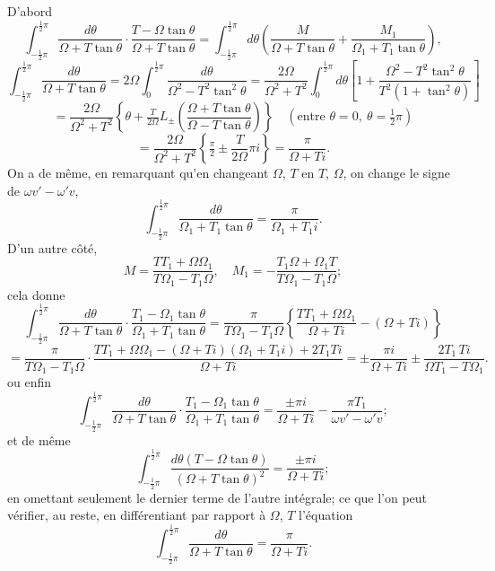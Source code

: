 \documentclass[12pt,a4paper]{article}
\begin{document}
D'abord
\[
\int_{-\frac12\pi}^{\frac12\pi}\frac{d\theta}{\Omega + T\tan\theta}\cdot\frac{T - \Omega\tan\theta}{\Omega + T\tan\theta} = \int_{-\frac12\pi}^{\frac12\pi}d\theta\!\left(\frac{M}{\Omega + T\tan\theta} + \frac{M_1}{\Omega_1 + T_1\tan\theta}\right),
\]
\[
\int_{-\frac12\pi}^{\frac12\pi}\frac{d\theta}{\Omega + T\tan\theta} = 2\Omega\int_0^{\frac12\pi}\frac{d\theta}{\Omega^2 - T^2\tan^2\theta} = \frac{2\Omega}{\Omega^2 + T^2}\int_0^{\frac12\pi}d\theta\!\left[1 + \frac{\Omega^2 - T^2\tan^2\theta}{T^2(1 + \tan^2\theta)}\right]
\]
\[
= \frac{2\Omega}{\Omega^2 + T^2}\!\left\{\theta + \tfrac{T}{2\Omega}L_{\pm}\!\left(\frac{\Omega + T\tan\theta}{\Omega - T\tan\theta}\right)\right\}\quad(\text{entre }\theta = 0,\ \theta = \tfrac12\pi)
\]
\[
= \frac{2\Omega}{\Omega^2 + T^2}\!\left\{\tfrac{\pi}{2} \pm \frac{T}{2\Omega}\pi i\right\} = \frac{\pi}{\Omega + Ti}.
\]
On a de m\^eme, en remarquant qu'en changeant $\Omega$, $T$ en $T$, $\Omega$, on change le signe de $\omega v' - \omega' v$,
\[
\int_{-\frac12\pi}^{\frac12\pi}\frac{d\theta}{\Omega_1 + T_1\tan\theta} = \frac{\pi}{\Omega_1 + T_1 i}.
\]
D'un autre c\^ot\'e,
\[
M = \frac{TT_1 + \Omega\Omega_1}{T\Omega_1 - T_1\Omega},\quad M_1 = -\frac{T_1\Omega + \Omega_1 T}{T\Omega_1 - T_1\Omega};
\]
cela donne
\[
\int_{-\frac12\pi}^{\frac12\pi}\frac{d\theta}{\Omega + T\tan\theta}\cdot\frac{T_1 - \Omega_1\tan\theta}{\Omega_1 + T_1\tan\theta} = \frac{\pi}{T\Omega_1 - T_1\Omega}\!\left\{\frac{TT_1 + \Omega\Omega_1}{\Omega + Ti} - (\Omega + T i)\right\}
\]
\[
= \frac{\pi}{T\Omega_1 - T_1\Omega}\cdot\frac{TT_1 + \Omega\Omega_1 - (\Omega + Ti)(\Omega_1 + T_1 i) + 2T_1 Ti}{\Omega + Ti} = \pm\frac{\pi i}{\Omega + Ti} \pm \frac{2T_1\,Ti}{\Omega T_1 - T\Omega_1}.
\]
ou enfin
\[
\int_{-\frac12\pi}^{\frac12\pi}\frac{d\theta}{\Omega + T\tan\theta}\cdot\frac{T_1 - \Omega_1\tan\theta}{\Omega_1 + T_1\tan\theta} = \frac{\pm\pi i}{\Omega + Ti} - \frac{\pi T_1}{\omega v' - \omega' v};
\]
et de m\^eme
\[
\int_{-\frac12\pi}^{\frac12\pi}\frac{d\theta(T - \Omega\tan\theta)}{(\Omega + T\tan\theta)^2} = \frac{\pm\pi i}{\Omega + Ti};
\]
en omettant seulement le dernier terme de l'autre int\'egrale; ce que l'on peut v\'erifier, au reste, en diff\'erentiant par rapport \`a $\Omega$, $T$ l'\'equation
\[
\int_{-\frac12\pi}^{\frac12\pi}\frac{d\theta}{\Omega + T\tan\theta} = \frac{\pi}{\Omega + Ti}.
\]

\newpage
\setcounter{page}{164}
\end{document}
